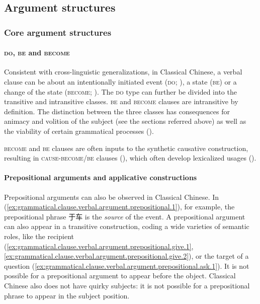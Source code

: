 \documentclass[UTF8, a4paper, oneside, scheme=plain, 12pt]{ctexrep}
\newcommand*{\term}[1]{\emph{#1}}
\newcommand*{\category}[1]{\textsc{#1}}
\begin{document}
\subsection{Argument structures}\label{sec:grammatical.clause.verbal.argument}

\subsubsection{Core argument structures}

\paragraph{\category{do}, \category{be} and \category{become}}
Consistent with cross-linguistic generalizations, in Classical Chinese,
a verbal clause can be about an intentionally initiated event (\category{do}; ),
a state (\category{be}) or a change of the state (\category{become}; ).
The \category{do} type can further be divided into the transitive and intransitive classes.
\category{be} and \category{become} clauses are intransitive by definition.
The distinction between the three classes has consequences for
animacy and volition of the subject (see the sections referred above)
as well as the viability of certain grammatical processes ().

\category{become} and \category{be} clauses are often inputs to the synthetic causative construction,
resulting in \category{cause}-\category{become}/\category{be} clauses
(),
which often develop lexicalized usages ().

\paragraph{Prepositional arguments and applicative constructions}\label{sec:grammatical.verbal.argument.prepositional}
Prepositional arguments can also be observed in Classical Chinese.
In (\ref{ex:grammatical.clause.verbal.argument.prepositional.1}),
for example, the prepositional phrase 于车 is the \term{source} of the event.
A prepositional argument can also appear in a transitive construction,
coding a wide varieties of semantic roles,
like the recipient (\ref{ex:grammatical.clause.verbal.argument.prepositional.give.1}, \ref{ex:grammatical.clause.verbal.argument.prepositional.give.2}),
or the target of a question (\ref{ex:grammatical.clause.verbal.argument.prepositional.ask.1}).
It is not possible for a prepositional argument to appear before the object.
Classical Chinese also does not have quirky subjects:
it is not possible for a prepositional phrase to appear in the subject position.
\end{document}

